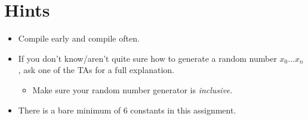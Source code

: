 \documentclass[12pt]{article}
\begin{document}
\section{Hints}
\begin{itemize}
    \item Compile early and compile often.
    \item If you don't know/aren't quite sure how to generate a random number $x_0 \ldots x_n$, ask one of the TAs for a full explanation.
    \begin{itemize}
        \item Make sure your random number generator is \textit{inclusive}.
    \end{itemize}
    \item There is a bare minimum of 6 constants in this assignment.
\end{itemize}
\end{document}
